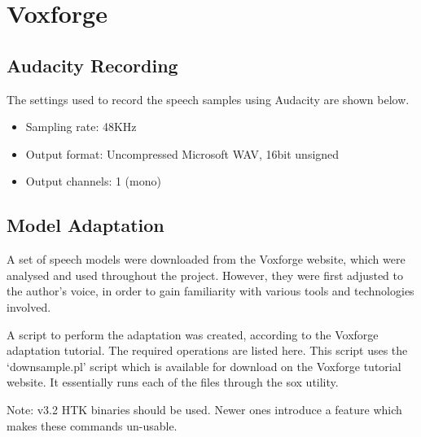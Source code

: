 \chapter{Voxforge} %
\label{apdx:voxforge}


\section{Audacity Recording} %
\label{apdx:audacity_recording}
	The settings used to record the speech samples using Audacity are shown below.
	\begin{itemize}
		\item Sampling rate: 48KHz
		\item Output format: Uncompressed Microsoft WAV, 16bit unsigned
		\item Output channels: 1 (mono)
	\end{itemize}


\section{Model Adaptation} %
\label{apdx:model_adaptation}
	A set of speech models were downloaded from the Voxforge website, which were analysed and used throughout the project.  However, they were first adjusted to the author's voice, in order to gain familiarity with various tools and technologies involved.

	A script to perform the adaptation was created, according to the Voxforge adaptation tutorial.  The required operations are listed here.  This script uses the `downsample.pl' script which is available for download on the Voxforge tutorial website.  It essentially runs each of the files through the sox utility.

	Note: v3.2 HTK binaries should be used.  Newer ones introduce a feature which makes these commands un-usable.


